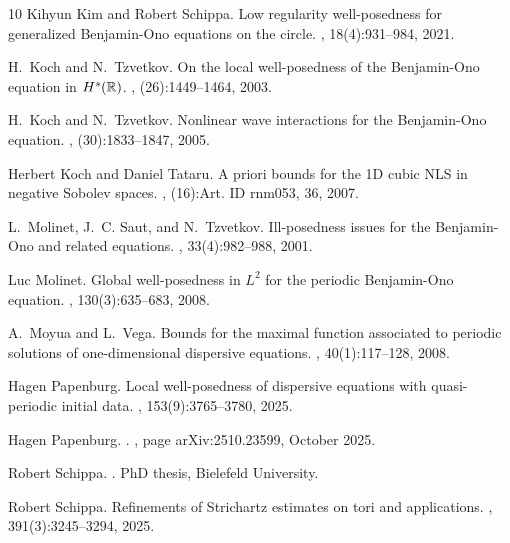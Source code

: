 \documentclass{amsart}
\theoremstyle{definition}
\begin{document}
\begin{thebibliography}{10}
Kihyun Kim and Robert Schippa.
\newblock Low regularity well-posedness for generalized {B}enjamin-{O}no
  equations on the circle.
, 18(4):931--984, 2021.

H.~Koch and N.~Tzvetkov.
\newblock On the local well-posedness of the {B}enjamin-{O}no equation in
  {$H^s({\Bbb R})$}.
, (26):1449--1464, 2003.

H.~Koch and N.~Tzvetkov.
\newblock Nonlinear wave interactions for the {B}enjamin-{O}no equation.
, (30):1833--1847, 2005.

Herbert Koch and Daniel Tataru.
\newblock A priori bounds for the 1{D} cubic {NLS} in negative {S}obolev
  spaces.
, (16):Art. ID rnm053, 36, 2007.

L.~Molinet, J.~C. Saut, and N.~Tzvetkov.
\newblock Ill-posedness issues for the {B}enjamin-{O}no and related equations.
, 33(4):982--988, 2001.

Luc Molinet.
\newblock Global well-posedness in {$L^2$} for the periodic {B}enjamin-{O}no
  equation.
, 130(3):635--683, 2008.

A.~Moyua and L.~Vega.
\newblock Bounds for the maximal function associated to periodic solutions of
  one-dimensional dispersive equations.
, 40(1):117--128, 2008.

Hagen Papenburg.
\newblock Local well-posedness of dispersive equations with quasi-periodic
  initial data.
, 153(9):3765--3780, 2025.

Hagen {Papenburg}.
.
, page arXiv:2510.23599, October 2025.

Robert Schippa.
.
\newblock PhD thesis, Bielefeld University.

Robert Schippa.
\newblock Refinements of {Strichartz} estimates on tori and applications.
, 391(3):3245--3294, 2025.


\end{thebibliography}
\end{document}
